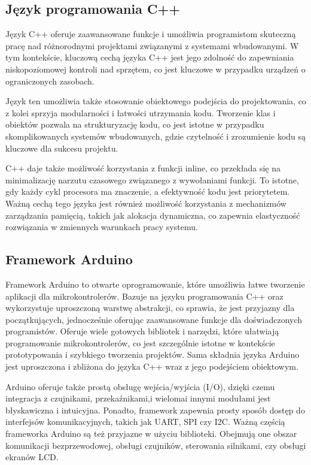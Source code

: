 \documentclass[12pt,twoside]{article}
\begin{document}
\subsection{Język programowania C++}
{Język C++ oferuje zaawansowane funkcje i umożliwia programistom skuteczną pracę nad różnorodnymi projektami związanymi z systemami wbudowanymi.
W tym kontekście, kluczową cechą języka C++ jest jego zdolność do zapewniania niskopoziomowej kontroli nad sprzętem,
co jest kluczowe w przypadku urządzeń o ograniczonych zasobach. 

Język ten umożliwia także stosowanie obiektowego podejścia do projektowania, co z kolei sprzyja modularności i łatwości utrzymania kodu.
Tworzenie klas i obiektów pozwala na strukturyzację kodu, co jest istotne w przypadku skomplikowanych systemów wbudowanych, gdzie 
czytelność i zrozumienie kodu są kluczowe dla sukcesu projektu.

C++ daje także możliwość korzystania z funkcji inline, co przekłada się na minimalizację narzutu czasowego związanego z wywołaniami funkcji.
To istotne, gdy każdy cykl procesora ma znaczenie, a efektywność kodu jest priorytetem. Ważną cechą tego języka  
 jest również możliwość korzystania z mechanizmów zarządzania pamięcią, takich jak alokacja dynamiczna, co zapewnia elastyczność rozwiązania
 w zmiennych warunkach pracy systemu.}
\subsection{Framework Arduino}
{Framework Arduino to otwarte oprogramowanie, które umożliwia łatwe tworzenie aplikacji dla mikrokontrolerów. 
Bazuje na języku programowania C++ oraz wykorzystuje uproszczoną warstwę abstrakcji, co sprawia, że 
jest przyjazny dla początkujących, jednocześnie oferując zaawansowane funkcje dla doświadczonych programistów.
Oferuje wiele gotowych bibliotek i narzędzi, które ułatwiają programowanie mikrokontrolerów, 
co jest szczególnie istotne w kontekście prototypowania i szybkiego tworzenia projektów.
Sama składnia języka Arduino jest uproszczona i zbliżona do języka C++ wraz z jego podejściem obiektowym.

Arduino oferuje także prostą obsługę wejścia/wyjścia (I/O), dzięki czemu integracja z czujnikami, przekaźnikami,i wielomai 
innymi modułami jest błyskawiczna i intuicyjna. Ponadto, framework zapewnia prosty sposób dostęp do interfejsów komunikacyjnych,
 takich jak UART, SPI czy I2C. Ważną częścią frameworka Arduino są też przyjazne w użyciu biblioteki. Obejmują one obszar komunikacji 
 bezprzewodowej, obsługi czujników, sterowania silnikami, czy obsługi ekranów LCD.}
\end{document}
